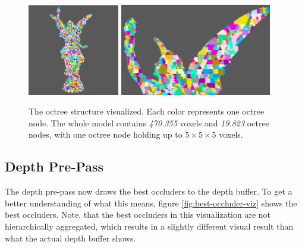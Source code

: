 \begin{figure}[h]
    \centering
    \includegraphics[width=151.5px]{images/graphics/lucy-voxel-octree-viz.png}
    \includegraphics[width=250px]{images/graphics/lucy-voxel-octree-viz-2.png}
    \caption{The octree structure visualized. Each color represents one octree node. The whole model contains 
    \emph{470.355} voxels and \emph{19.823} octree nodes, with one octree node holding up to \begin{math} 5 \times 5 \times 5 \end{math}
    voxels.}
    \label{fig:voxel-octree-viz}
\end{figure}

\subsection*{Depth Pre-Pass}

The depth pre-pass now draws the best occluders to the depth buffer. To get a better understanding of what this 
means, figure \ref{fig:best-occluder-viz} shows the best occluders. Note, that the best occluders in this 
visualization are not hierarchically aggregated, which results in a slightly different visual result than what 
the actual depth buffer shows. 

